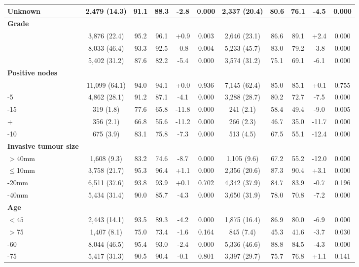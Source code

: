 \begin{landscape}
\begin{table}[ht]
{\begin{tabular}{lcccccccccc}
\quad Unknown & 2,479 (14.3) & 91.1 & 88.3 & -2.8 & 0.000 & 2,337 (20.4) & 80.6 & 76.1 & -4.5 & 0.000 \\
\midrule
\textbf{Grade} \\
\quad 1 & 3,876 (22.4) & 95.2 & 96.1 & +0.9 & 0.003 & 2,646 (23.1) & 86.6 & 89.1 & +2.4 & 0.000 \\
\quad 2 & 8,033 (46.4) & 93.3 & 92.5 & -0.8 & 0.004 & 5,233 (45.7) & 83.0 & 79.2 & -3.8 & 0.000 \\
\quad 3 & 5,402 (31.2) & 87.6 & 82.2 & -5.4 & 0.000 & 3,574 (31.2) & 75.1 & 69.1 & -6.1 & 0.000 \\
\midrule
\textbf{Positive nodes} \\
\quad 0 & 11,099 (64.1) & 94.0 & 94.1 & +0.0 & 0.936 & 7,145 (62.4) & 85.0 & 85.1 & +0.1 & 0.755 \\
\quad 1-5 & 4,862 (28.1) & 91.2 & 87.1 & -4.1 & 0.000 & 3,288 (28.7) & 80.2 & 72.7 & -7.5 & 0.000 \\
\quad 11-15 & 319 (1.8) & 77.6 & 65.8 & -11.8 & 0.000 & 241 (2.1) & 58.4 & 49.4 & -9.0 & 0.005 \\
\quad 16+ & 356 (2.1) & 66.8 & 55.6 & -11.2 & 0.000 & 266 (2.3) & 46.7 & 35.0 & -11.7 & 0.000 \\
\quad 6-10 & 675 (3.9) & 83.1 & 75.8 & -7.3 & 0.000 & 513 (4.5) & 67.5 & 55.1 & -12.4 & 0.000 \\
\midrule
\textbf{Invasive tumour size} \\
\quad $>$40mm & 1,608 (9.3) & 83.2 & 74.6 & -8.7 & 0.000 & 1,105 (9.6) & 67.2 & 55.2 & -12.0 & 0.000 \\
\quad $\leq$10mm & 3,758 (21.7) & 95.3 & 96.4 & +1.1 & 0.000 & 2,356 (20.6) & 87.3 & 90.4 & +3.1 & 0.000 \\
\quad 11-20mm & 6,511 (37.6) & 93.8 & 93.9 & +0.1 & 0.702 & 4,342 (37.9) & 84.7 & 83.9 & -0.7 & 0.196 \\
\quad 21-40mm & 5,434 (31.4) & 90.0 & 85.7 & -4.3 & 0.000 & 3,650 (31.9) & 78.0 & 70.8 & -7.2 & 0.000 \\
\midrule
\textbf{Age} \\
\quad $<45$ & 2,443 (14.1) & 93.5 & 89.3 & -4.2 & 0.000 & 1,875 (16.4) & 86.9 & 80.0 & -6.9 & 0.000 \\
\quad $>$75 & 1,407 (8.1) & 75.0 & 73.4 & -1.6 & 0.164 & 845 (7.4) & 45.3 & 41.6 & -3.7 & 0.030 \\
\quad 45-60 & 8,044 (46.5) & 95.4 & 93.0 & -2.4 & 0.000 & 5,336 (46.6) & 88.8 & 84.5 & -4.3 & 0.000 \\
\quad 61-75 & 5,417 (31.3) & 90.5 & 90.4 & -0.1 & 0.801 & 3,397 (29.7) & 75.7 & 76.8 & +1.1 & 0.141 \\

\end{tabular}}
\end{table}
\end{landscape}
